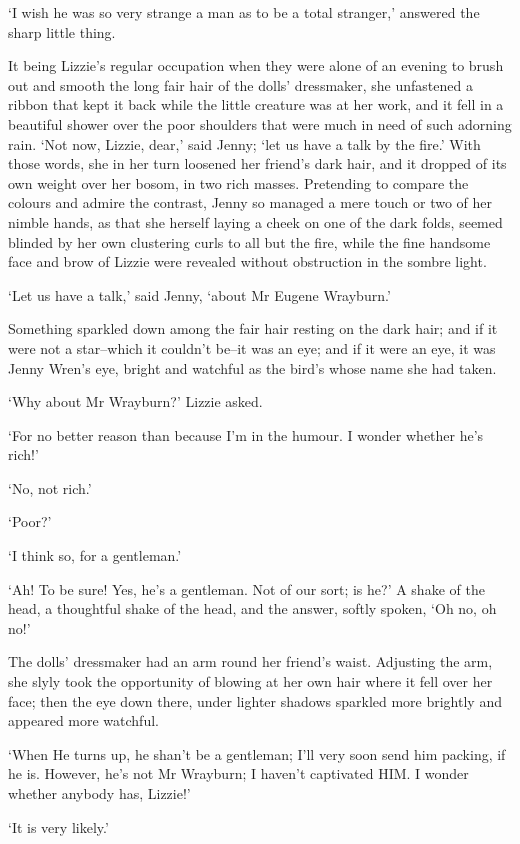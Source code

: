 ‘I wish he was so very strange a man as to be a total stranger,’
answered the sharp little thing.

It being Lizzie’s regular occupation when they were alone of an evening
to brush out and smooth the long fair hair of the dolls’ dressmaker, she
unfastened a ribbon that kept it back while the little creature was at
her work, and it fell in a beautiful shower over the poor shoulders that
were much in need of such adorning rain. ‘Not now, Lizzie, dear,’ said
Jenny; ‘let us have a talk by the fire.’ With those words, she in her
turn loosened her friend’s dark hair, and it dropped of its own weight
over her bosom, in two rich masses. Pretending to compare the colours
and admire the contrast, Jenny so managed a mere touch or two of her
nimble hands, as that she herself laying a cheek on one of the dark
folds, seemed blinded by her own clustering curls to all but the fire,
while the fine handsome face and brow of Lizzie were revealed without
obstruction in the sombre light.

‘Let us have a talk,’ said Jenny, ‘about Mr Eugene Wrayburn.’

Something sparkled down among the fair hair resting on the dark hair;
and if it were not a star--which it couldn’t be--it was an eye; and
if it were an eye, it was Jenny Wren’s eye, bright and watchful as the
bird’s whose name she had taken.

‘Why about Mr Wrayburn?’ Lizzie asked.

‘For no better reason than because I’m in the humour. I wonder whether
he’s rich!’

‘No, not rich.’

‘Poor?’

‘I think so, for a gentleman.’

‘Ah! To be sure! Yes, he’s a gentleman. Not of our sort; is he?’ A shake
of the head, a thoughtful shake of the head, and the answer, softly
spoken, ‘Oh no, oh no!’

The dolls’ dressmaker had an arm round her friend’s waist. Adjusting the
arm, she slyly took the opportunity of blowing at her own hair where
it fell over her face; then the eye down there, under lighter shadows
sparkled more brightly and appeared more watchful.

‘When He turns up, he shan’t be a gentleman; I’ll very soon send him
packing, if he is. However, he’s not Mr Wrayburn; I haven’t captivated
HIM. I wonder whether anybody has, Lizzie!’

‘It is very likely.’

